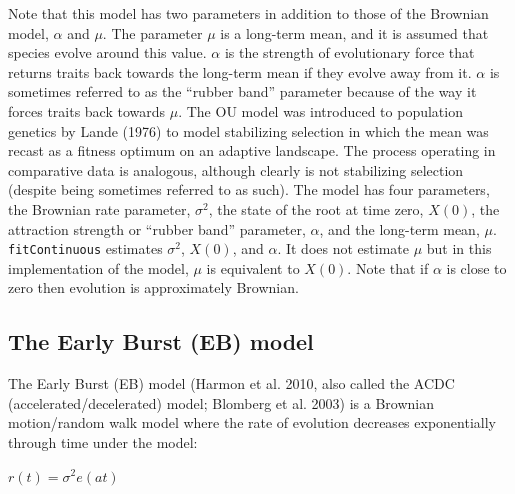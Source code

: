 \documentclass[]{book}
\begin{document}
Note that this model has two parameters in addition to those of the
Brownian model, \(\alpha\) and \(\mu\). The parameter \(\mu\) is a
long-term mean, and it is assumed that species evolve around this value.
\(\alpha\) is the strength of evolutionary force that returns traits
back towards the long-term mean if they evolve away from it. \(\alpha\)
is sometimes referred to as the ``rubber band'' parameter because of the
way it forces traits back towards \(\mu\). The OU model was introduced
to population genetics by Lande (1976) to model stabilizing selection in
which the mean was recast as a fitness optimum on an adaptive landscape.
The process operating in comparative data is analogous, although clearly
is not stabilizing selection (despite being sometimes referred to as
such). The model has four parameters, the Brownian rate parameter,
\(\sigma^2\), the state of the root at time zero, \(X(0)\), the
attraction strength or ``rubber band'' parameter, \(\alpha\), and the
long-term mean, \(\mu\). \texttt{fitContinuous} estimates \(\sigma^2\),
\(X(0)\), and \(\alpha\). It does not estimate \(\mu\) but in this
implementation of the model, \(\mu\) is equivalent to \(X(0)\). Note
that if \(\alpha\) is close to zero then evolution is approximately
Brownian.

\subsection{The Early Burst (EB) model}\label{the-early-burst-eb-model}

The Early Burst (EB) model (Harmon et al. 2010, also called the ACDC
(accelerated/decelerated) model; Blomberg et al. 2003) is a Brownian
motion/random walk model where the rate of evolution decreases
exponentially through time under the model:

\(r(t) = \sigma^2e(at)\)
\end{document}
